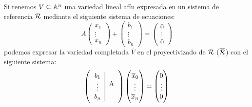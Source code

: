 \begin{prop}
 Si tenemos $V \subseteq \mathbb{A}^n$ una variedad lineal afín expresada en un sistema
 de referencia $\mathcal{R}$ mediante el siguiente sistema de ecuaciones:
 \[
   A 
   \begin{pmatrix} x_1 \\ \vdots \\ x_n \end{pmatrix} 
   + 
   \begin{pmatrix}
     b_1 \\ \vdots \\ b_n
   \end{pmatrix}
   =
   \begin{pmatrix}
     0 \\ \vdots \\ 0
   \end{pmatrix}
 \]
 podemos expresar la variedad completada $\overline{V}$ en
 el proyectivizado de $\mathcal{R}$ ($\overline{\mathcal{R}}$) con el siguiente sistema:
  \[
   \lp
   \begin{tabular}{c|c} $b_1$ & \multirow{3}{*}{A} \\ $\vdots$ & \\ $b_n$ & \end{tabular} 
   \rp 
   \begin{pmatrix}
     \overline{x}_0 \\ \vdots \\ \overline{x}_n 
   \end{pmatrix}
   =
   \begin{pmatrix}
     0 \\ \vdots \\ 0
   \end{pmatrix}
 \]
 \end{prop}

